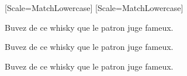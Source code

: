   \setmainfont{TeX Gyre Bonum}
  \setsansfont{Latin Modern Sans}[Scale=MatchLowercase]
  \setmonofont{Inconsolata}[Scale=MatchLowercase]

  \rmfamily Buvez de ce whisky que le patron juge fameux. \par
  \sffamily Buvez de ce whisky que le patron juge fameux. \par
  \ttfamily Buvez de ce whisky que le patron juge fameux.
